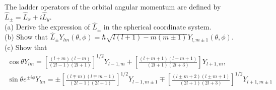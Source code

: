 \documentclass[12pt,a4paper]{article}
\newenvironment{problem}[2][Problem]{\begin{trivlist}
\item[\hskip \labelsep {\bfseries #1}\hskip \labelsep {\bfseries #2.}]}{\end{trivlist}}
\begin{document}
\begin{problem}{5}
The ladder operators of the orbital angular momentum are defined by $\hat{L}_{\pm}=\hat{L}_x+i\hat{L}_y$.\\
(a) Derive the expression of $\hat{L}_{\pm}$ in the spherical coordinate system.\\
(b) Show that $\hat{L}_{\pm}Y_{lm}(\theta,\phi)=\hbar\sqrt{l(l+1)-m(m\pm1)}Y_{l,m\pm1}(\theta,\phi)$.\\
(c) Show that
\begin{gather*}
\cos\theta Y_{lm}=\left[\frac{(l+m)(l-m)}{(2l-1)(2l+1)}\right]^{1/2}Y_{l-1,m}+\left[\frac{(l+m+1)(l-m+1)}{(2l+1)(2l+3)}\right]Y_{l+1,m},\\
\sin\theta e^{\pm i\phi}Y_{lm}=\pm\left[\frac{(l\mp m)(l\mp m-1)}{(2l-1)(2l+1)}\right]^{1/2}Y_{l-1,m\pm1}\mp\left[\frac{(l\pm m+2)(l\pm m+1)}{(2l+1)(2l+3)}\right]^{1/2}Y_{l+1,m\pm1}
\end{gather*}
\end{problem}
\end{document}
